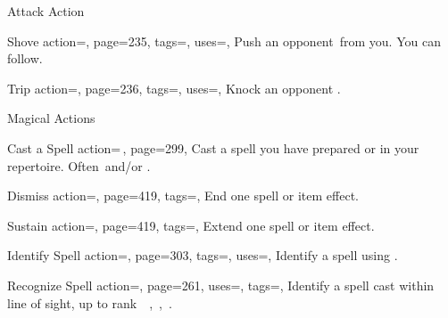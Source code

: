 \begin{PageBack}
\begin{Tables}{\backTableHeight}
\begin{Table}{Attack Action}
\begin{entry}{Shove}{%
                action=,
                page=235,
                tags=\Attack,
                uses=\AthleticsFortitude,
            }
                Push an opponent \,\Feet from you. You can follow. \hfill{}
            \end{entry}
            \begin{entry}{Trip}{%
                action=,
                page=236,
                tags=\Attack,
                uses=\AthleticsReflex,
            }
                Knock an opponent \Prone.\hfill{}\quad{}
            \end{entry}
        \end{Table}
        \TableSpace
        \begin{Table}{Magical Actions}
            \begin{entry}{Cast a Spell}{%
                action={\,\sffamily{}},
                page=299,
            }
                Cast a spell you have prepared or in your repertoire. Often \Manipulate\,and/or \Concentrate.\hfill {}
            \end{entry}
            \begin{entry}{Dismiss}{%
                action=,
                page=419,
                tags=\Concentrate,
            }
                End one spell or item effect.
            \end{entry}
            \begin{entry}{Sustain}{%
                action=,
                page=419,
                tags=\Concentrate,
            }
                Extend one spell or item effect.\hfill {}
            \end{entry}
            \begin{entry}{Identify Spell}{%
                action=,
                page=303,
                tags=\Concentrate,
                uses={\MagicalSkill[tags={S}]},
            }
                Identify a spell using .
            \end{entry}
            \begin{entry}{Recognize Spell}{%
                action=,
                page=261,
                uses={\MagicalSkill[tags={T,S}]\Feat},
                tags=\Concentrate,
            }
                Identify a spell cast within line of sight, up to rank \Ts\, \E\,, \M\,, \Le\,.

\end{entry}
\end{Table}
\end{Tables}
\end{PageBack}
